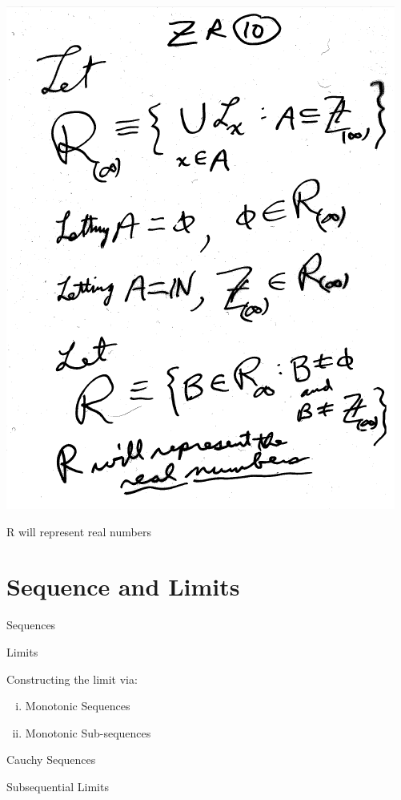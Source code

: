 \documentclass[10pt,a4paper]{article}
\begin{document}
{{\includegraphics[scale=0.6]{pages/ZR10.png}

R will represent real numbers 


\section{Sequence and Limits}


Sequences

Limits

Constructing the limit via:

\begin{enumerate} [(i)]

\item Monotonic Sequences
\item Monotonic Sub-sequences 

\end{enumerate}

Cauchy Sequences

Subsequential Limits 

}}
\end{document}
